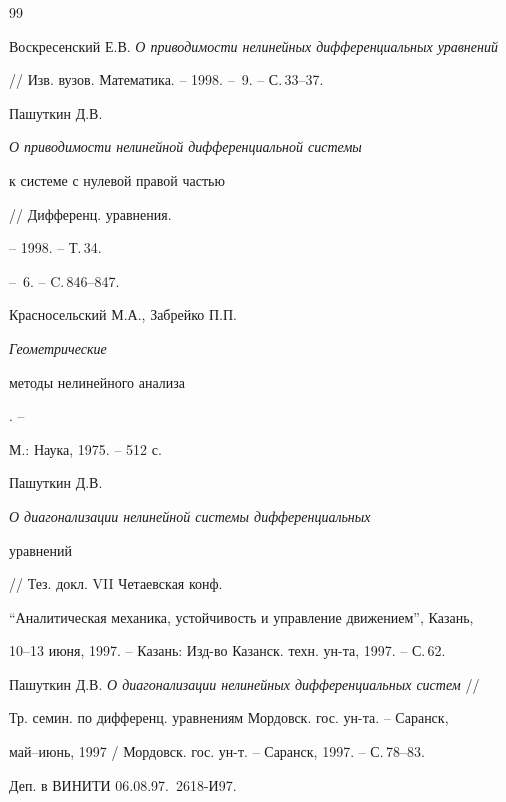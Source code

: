 \begin{thebibliography}{99}


Воскресенский Е.В. {\em О приводимости нелинейных дифференциальных уравнений}


// Изв. вузов. Математика. -- 1998. -- \No\,9. -- С.\,33--37.







Пашуткин Д.В. {\em О приводимости нелинейной дифференциальной системы


к системе с нулевой правой частью} // Дифференц. уравнения.


-- 1998. -- Т.\,34.


-- \No\,6. -- C.\,846--847.







Красносельский М.А., Забрейко П.П. {\em Геометрические


методы нелинейного анализа}. --


М.: Наука, 1975. -- 512 с.







Пашуткин Д.В. {\em О диагонализации нелинейной системы дифференциальных


уравнений} // Тез. докл. VII Четаевская конф. 


``Аналитическая механика, устойчивость и управление движением'', Казань,


10--13 июня, 1997. -- Казань: Изд-во Казанск. техн. ун-та, 1997. -- С.\,62.







Пашуткин Д.В. {\em О диагонализации нелинейных дифференциальных систем} //


Тр. семин. по дифференц. уравнениям Мордовск. гос. ун-та. -- Саранск,


май--июнь, 1997 / Мордовск. гос. ун-т. -- Саранск, 1997. -- С.\,78--83.


Деп. в ВИНИТИ 06.08.97. \No\,2618-И97.





\end{thebibliography}





\vskip 2cm












\label{end}





